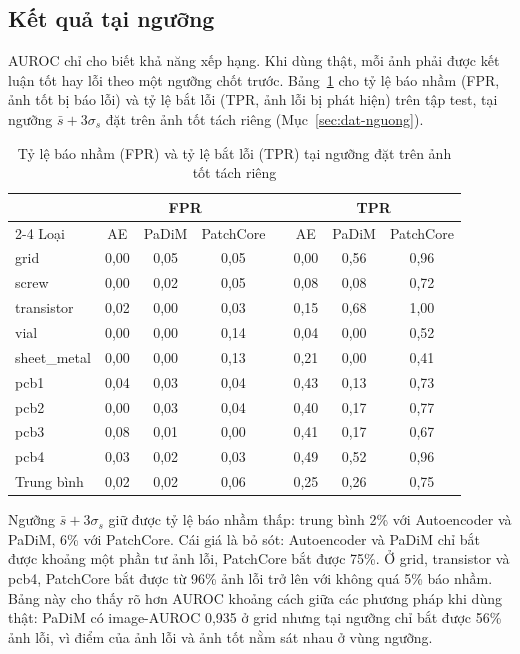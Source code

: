 \subsection{Kết quả tại ngưỡng}
\label{sec:nguong}

AUROC chỉ cho biết khả năng xếp hạng. Khi dùng thật, mỗi ảnh phải được kết luận tốt hay lỗi theo một ngưỡng chốt
trước. Bảng~\ref{tab:threshold} cho tỷ lệ báo nhầm (FPR, ảnh tốt bị báo lỗi) và tỷ lệ bắt lỗi (TPR, ảnh lỗi bị phát
hiện) trên tập test, tại ngưỡng $\bar{s} + 3\sigma_s$ đặt trên ảnh tốt tách riêng (Mục~\ref{sec:dat-nguong}).

\begin{table}[htbp]
  \centering
  \caption[FPR và TPR tại ngưỡng đặt trên ảnh tốt tách riêng]{Tỷ lệ báo nhầm (FPR) và tỷ lệ bắt lỗi (TPR) tại ngưỡng đặt trên ảnh tốt tách riêng}
  \label{tab:threshold}
  \small
  \begin{tabular}{@{}lccccccc@{}}
    \toprule
    & \multicolumn{3}{c}{FPR} && \multicolumn{3}{c}{TPR} \\
    \cmidrule{2-4}\cmidrule{6-8}
    Loại & AE & PaDiM & PatchCore && AE & PaDiM & PatchCore \\
    \midrule
    grid        & 0,00 & 0,05 & 0,05 && 0,00 & 0,56 & 0,96 \\
    screw       & 0,00 & 0,02 & 0,05 && 0,08 & 0,08 & 0,72 \\
    transistor  & 0,02 & 0,00 & 0,03 && 0,15 & 0,68 & 1,00 \\
    vial        & 0,00 & 0,00 & 0,14 && 0,04 & 0,00 & 0,52 \\
    sheet\_metal & 0,00 & 0,00 & 0,13 && 0,21 & 0,00 & 0,41 \\
    pcb1        & 0,04 & 0,03 & 0,04 && 0,43 & 0,13 & 0,73 \\
    pcb2        & 0,00 & 0,03 & 0,04 && 0,40 & 0,17 & 0,77 \\
    pcb3        & 0,08 & 0,01 & 0,00 && 0,41 & 0,17 & 0,67 \\
    pcb4        & 0,03 & 0,02 & 0,03 && 0,49 & 0,52 & 0,96 \\
    \midrule
    Trung bình  & 0,02 & 0,02 & 0,06 && 0,25 & 0,26 & 0,75 \\
    \bottomrule
  \end{tabular}
\end{table}

Ngưỡng $\bar{s} + 3\sigma_s$ giữ được tỷ lệ báo nhầm thấp: trung bình 2\% với Autoencoder và PaDiM, 6\% với PatchCore.
Cái giá là bỏ sót: Autoencoder và PaDiM chỉ bắt được khoảng một phần tư ảnh lỗi, PatchCore bắt được 75\%. Ở grid,
transistor và pcb4, PatchCore bắt được từ 96\% ảnh lỗi trở lên với không quá 5\% báo nhầm. Bảng này cho thấy rõ hơn
AUROC khoảng cách giữa các phương pháp khi dùng thật: PaDiM có image-AUROC 0,935 ở grid nhưng tại ngưỡng chỉ bắt
được 56\% ảnh lỗi, vì điểm của ảnh lỗi và ảnh tốt nằm sát nhau ở vùng ngưỡng.

